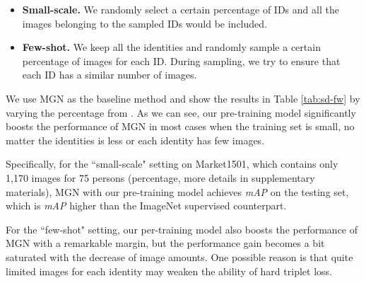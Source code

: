 \documentclass[final]{cvpr}
\begin{document}
\begin{itemize}
    \item \textbf{Small-scale.} We randomly select a certain percentage of IDs and all the images belonging to the sampled IDs would be included.
    \item \textbf{Few-shot.} We keep all the identities and randomly sample a certain percentage of images for each ID. During sampling, we try to ensure that each ID has a similar number of images.
\end{itemize}

We use MGN as the baseline method and show the results in Table \ref{tab:sd-fw} by varying the percentage from . As we can see, our pre-training model significantly boosts the performance of MGN in most cases when the training set is small, no matter the identities is less or each identity has few images. 

Specifically, for the ``small-scale" setting on Market1501, which contains only 1,170 images for 75 persons (percentage, more details in supplementary materials), MGN with our pre-training model achieves  \emph{mAP} on the testing set, which is  \emph{mAP} higher than the ImageNet supervised counterpart. 

For the ``few-shot" setting, our per-training model also boosts the performance of MGN with a remarkable margin, but the performance gain becomes a bit saturated with the decrease of image amounts. One possible reason is that quite limited images for each identity may weaken the ability of hard triplet loss. 
\end{document}
